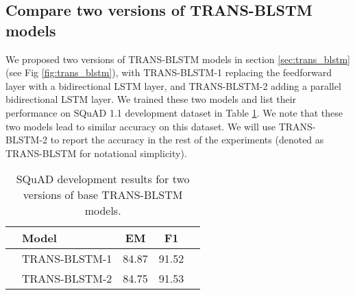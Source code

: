 \documentclass[11pt,a4paper]{article}
\begin{document}
\subsection{Compare two versions of TRANS-BLSTM models} \label{sec:two_versions}
We proposed two versions of TRANS-BLSTM models in section \ref{sec:trans_blstm} (see Fig \ref{fig:trans_blstm}), with TRANS-BLSTM-1 replacing the feedforward layer with a bidirectional LSTM layer, and TRANS-BLSTM-2 adding a parallel bidirectional LSTM layer. We trained these two models and list their performance on SQuAD 1.1 development dataset in Table \ref{tab:squad_two_version}. We note that these two models lead to similar accuracy on this dataset. We will use TRANS-BLSTM-2 to report the accuracy in the rest of the experiments (denoted as TRANS-BLSTM for notational simplicity).
\begin{table}[!hbpt]
\centering
    \begin{tabular}{llccc}
  & Model & EM & F1 \\ \hline
  & TRANS-BLSTM-1  & 84.87& 91.52 \\ 
     & TRANS-BLSTM-2  & 84.75 & 91.53 \\ \hline
\end{tabular}
    \caption{SQuAD development results for two versions of  base TRANS-BLSTM models.}
\label{tab:squad_two_version}
\end{table} 
\end{document}
